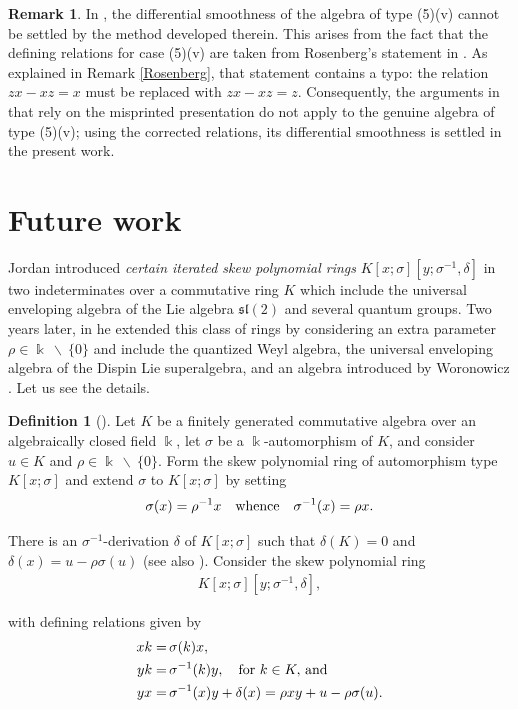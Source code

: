 \documentclass{amsart}
\theoremstyle{definition}
\newtheorem{definition}[theorem]{Definition}
\newtheorem{remark}[theorem]{Remark}
\theoremstyle{remark}
\numberwithin{equation}{section}
\begin{document}
\begin{remark}
In \cite{ReyesSarmiento2022}, the differential smoothness of the algebra of type (5)(v) cannot be settled by the method developed therein. This arises from the fact that the defining relations for case (5)(v) are taken from Rosenberg's statement in \cite[Theorem C4.3.1, case (e)(v), p. 101]{Rosenberg1995}. As explained in Remark \ref{Rosenberg}, that statement contains a typo: the relation $zx-xz=x$ must be replaced with $zx-xz=z$. Consequently, the arguments in \cite{ReyesSarmiento2022} that rely on the misprinted presentation do not apply to the genuine algebra of type (5)(v); using the corrected relations, its differential smoothness is settled in the present work.
\end{remark}


\section{Future work}\label{Futurework}

Jordan \cite{Jordan1993} introduced {\em certain iterated skew polynomial rings} $K[x; \sigma][y; \sigma^{-1}, \delta]$ in two indeterminates over a commutative ring $K$ which include the universal enveloping algebra of the Lie algebra $\mathfrak{sl}(2)$ and several quantum groups. Two years later, in \cite{Jordan1995} he extended this class of rings by considering an extra parameter $\rho \in \Bbbk \ \backslash \ \{0\}$ and include the quantized Weyl algebra, the universal enveloping algebra of the Dispin Lie superalgebra, and an algebra introduced by Woronowicz \cite{Woronowicz1987}. Let us see the details.

\begin{definition}[{\cite[Section 1.1]{Jordan1995}}]\label{Jordan1995Section1.1}
Let $K$ be a finitely generated commutative algebra over an algebraically closed field $\Bbbk$, let $\sigma$ be a $\Bbbk$-automorphism of $K$, and consider $u\in K$ and $\rho \in \Bbbk \ \backslash \ \{0\}$. Form the skew polynomial ring of automorphism type $K[x;\sigma]$ and extend $\sigma$ to $K[x;\sigma]$ by setting 
$$
\sigma(x) = \rho^{-1}x \quad {\rm whence} \quad \sigma^{-1}(x) = \rho x.
$$

There is an $\sigma^{-1}$-derivation $\delta$ of $K[x;\sigma]$ such that $\delta(K) = 0$ and $\delta(x) = u - \rho \sigma(u)$ \cite[p. 41]{Cohn1985} (see also \cite[Section 2.8]{GoodearlLetzter1994}). Consider the skew polynomial ring
\begin{align*}
K[x;\sigma][y;\sigma^{-1},\delta], 
\end{align*}

with defining relations given by 
\begin{align}
    xk = &\, \sigma(k)x, \\ 
    yk = &\, \sigma^{-1}(k)y, \quad {\rm for}\ k\in K, \, {\rm and} \\
    yx = &\, \sigma^{-1}(x)y + \delta(x) = \rho xy + u - \rho \sigma(u).
\end{align}
\end{definition}
\end{document}
